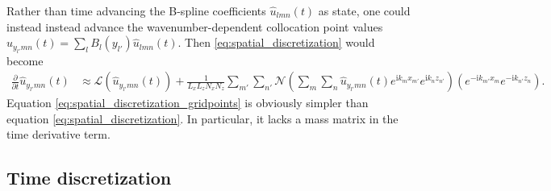 \documentclass[letterpaper,11pt,nointlimits,reqno]{amsart}
\newcommand{\ii}{\ensuremath{\mathrm{i}}}
\begin{document}
Rather than time advancing the B-spline coefficients $\hat{u}_{l m n}(t)$ as
state, one could instead instead advance the wavenumber-dependent collocation
point values $\hat{u}_{y_{l'} m n}(t) = \sum_{l} B_l\!\left(y_{l'}\right)
\hat{u}_{l m n}(t)$.  Then \eqref{eq:spatial_discretization} would become
\begin{align}
  \frac{\partial}{\partial{}t} \hat{u}_{y_{l'} m n}(t)
  &\approx
  \mathscr{L}\left(\hat{u}_{y_{l'} m n}(t)\right)
  +
  \frac{1}{L_x L_z N_x N_z}
  \sum_{m'} \sum_{n'}
  \mathscr{N}\left(
    \sum_{m}
    \sum_{n}
    \hat{u}_{y_{l'} m n}(t)
    e^{\ii k_m x_{m'}}e^{\ii k_n z_{n'}}
  \right)
  \left(
    e^{-\ii k_{m'} x_m}e^{-\ii k_{n'} z_n}
  \right)
  .
  \label{eq:spatial_discretization_gridpoints}
\end{align}
Equation \eqref{eq:spatial_discretization_gridpoints} is obviously simpler than
equation \eqref{eq:spatial_discretization}.  In particular, it lacks a mass
matrix in the time derivative term.

\subsection{Time discretization}
\end{document}
